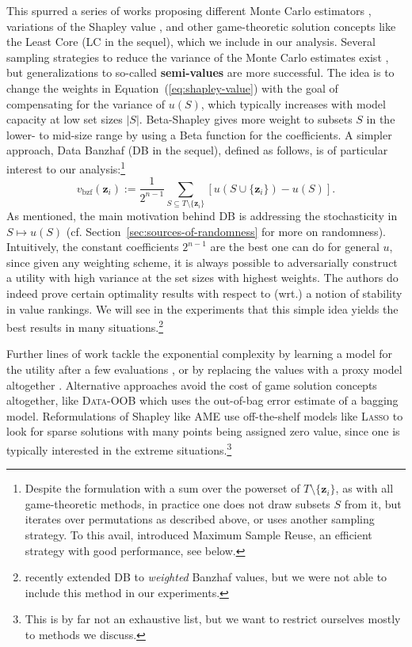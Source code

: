 \documentclass[10pt]{article}
\newcommand{\assign}{:=}
\newcommand{\tmdfn}[1]{\textbf{#1}}
\newcommand{\tmem}[1]{{\em #1\/}}
\newcommand{\tmmathbf}[1]{\ensuremath{\boldsymbol{#1}}}
\newcommand{\tmname}[1]{\textsc{#1}}
\newcommand{\tmop}[1]{\ensuremath{\operatorname{#1}}}
\begin{document}
This spurred a series of works proposing different Monte Carlo estimators
{\citep{okhrati_multilinear_2021}}, variations of the Shapley value
{\citep{kwon_efficient_2021}}, and other game-theoretic solution concepts
like the Least Core {\citep{yan_if_2021,benmerzoug_re_2023}} (LC in the
sequel), which we include in our analysis. Several sampling strategies to
reduce the variance of the Monte Carlo estimates exist
{\citep{wu_variance_2023,covert_stochastic_2024}}, but generalizations to
so-called {\tmdfn{semi-values}} are more successful. The idea is to change the
weights in  Equation~(\ref{eq:shapley-value}) with the goal of compensating
for the variance of $u (S)$, which typically increases with model capacity at
low set sizes $|S|$. Beta-Shapley {\citep{kwon_beta_2022}} gives more weight
to subsets $S$ in the lower- to mid-size range by using a Beta function for
the coefficients. A simpler approach, Data Banzhaf {\citep{wang_data_2023}}
(DB in the sequel), defined as follows, is of particular interest to our
analysis:\footnote{Despite the formulation with a sum over the powerset of $T
\setminus \{\tmmathbf{z}_i \}$, as with all game-theoretic methods, in
practice one does not draw subsets $S$ from it, but iterates over permutations
as described above, or uses another sampling strategy. To this avail,
{\cite{wang_data_2023}} introduced Maximum Sample Reuse, an efficient
strategy with good performance, see below.}
\begin{equation}
  v_{\tmop{bzf}} (\tmmathbf{z}_i) \assign \frac{1}{2^{n - 1}}  \sum_{S
  \subseteq T \setminus \{\tmmathbf{z}_i \}} [u (S \cup \{\tmmathbf{z}_i \}) -
  u (S)] . \label{eq:banzhaf-value}
\end{equation}
As mentioned, the main motivation behind DB is addressing the stochasticity in
$S \mapsto u (S)$ (cf.  Section~\ref{sec:sources-of-randomness} for more on
randomness). Intuitively, the constant coefficients $2^{n - 1}$ are the best
one can do for general $u$, since given any weighting scheme, it is always
possible to adversarially construct a utility with high variance at the set
sizes with highest weights. The authors do indeed prove certain optimality
results with respect to (wrt.) a notion of stability in value rankings.
We will see in the experiments that this simple idea yields the best results in
many situations.\footnote{{\citep{li_robust_2023}} recently extended DB to
{\tmem{weighted}} Banzhaf values, but we were not able to include this method
in our experiments.}

Further lines of work tackle the exponential complexity by learning a model
for the utility after a few evaluations {\citep{wang_improving_2022}}, or by
replacing the values with a proxy model altogether
{\cite{jia_scalability_2021}}. Alternative approaches avoid the cost of game
solution concepts altogether, like {\tmname{Data-OOB}}
{\cite{kwon_dataoob_2023}} which uses the out-of-bag error estimate of a
bagging model. Reformulations of Shapley like AME {\cite{lin_measuring_2022}}
use off-the-shelf models like {\tmname{Lasso}} to look for sparse solutions
with many points being assigned zero value, since one is typically interested
in the extreme situations.\footnote{This is by far not an exhaustive list, but
we want to restrict ourselves mostly to methods we discuss.}
\end{document}
